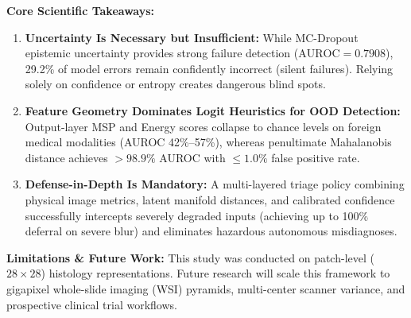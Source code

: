 \documentclass[11pt,a4paper]{article}
\begin{document}
\noindent\textbf{Core Scientific Takeaways:}
\begin{enumerate}[leftmargin=*,itemsep=1pt,topsep=2pt]
    \item \textbf{Uncertainty Is Necessary but Insufficient:} While MC-Dropout epistemic uncertainty provides strong failure detection ($\text{AUROC} = 0.7908$), 29.2\% of model errors remain confidently incorrect (silent failures). Relying solely on confidence or entropy creates dangerous blind spots.
    \item \textbf{Feature Geometry Dominates Logit Heuristics for OOD Detection:} Output-layer MSP and Energy scores collapse to chance levels on foreign medical modalities (AUROC 42\%--57\%), whereas penultimate Mahalanobis distance achieves $>98.9\%$ AUROC with $\le 1.0\%$ false positive rate.
    \item \textbf{Defense-in-Depth Is Mandatory:} A multi-layered triage policy combining physical image metrics, latent manifold distances, and calibrated confidence successfully intercepts severely degraded inputs (achieving up to 100\% deferral on severe blur) and eliminates hazardous autonomous misdiagnoses.
\end{enumerate}

\noindent\textbf{Limitations \& Future Work:}
This study was conducted on patch-level ($28 \times 28$) histology representations. Future research will scale this framework to gigapixel whole-slide imaging (WSI) pyramids, multi-center scanner variance, and prospective clinical trial workflows.

\end{document}
